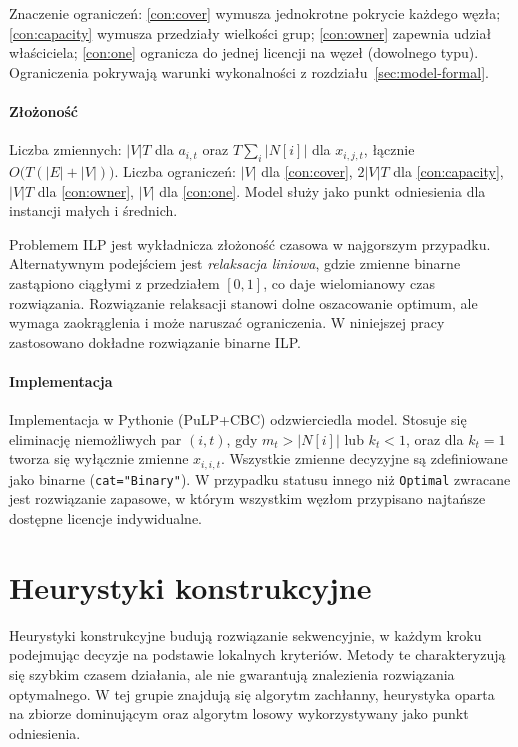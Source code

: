 Znaczenie ograniczeń: \eqref{con:cover} wymusza jednokrotne pokrycie każdego węzła; \eqref{con:capacity} wymusza przedziały wielkości grup; \eqref{con:owner} zapewnia udział właściciela; \eqref{con:one} ogranicza do jednej licencji na węzeł (dowolnego typu). Ograniczenia pokrywają warunki wykonalności z rozdziału~\ref{sec:model-formal}.

\paragraph{Złożoność}
Liczba zmiennych: \(|V|T\) dla \(a_{i,t}\) oraz \(T\sum_i |N[i]|\) dla \(x_{i,j,t}\), łącznie \(O\!\bigl(T(|E|+|V|)\bigr)\).
Liczba ograniczeń: \(|V|\) dla \eqref{con:cover}, \(2|V|T\) dla \eqref{con:capacity}, \(|V|T\) dla \eqref{con:owner}, \(|V|\) dla \eqref{con:one}.
Model służy jako punkt odniesienia dla instancji małych i średnich.

Problemem ILP jest wykładnicza złożoność czasowa w najgorszym przypadku. Alternatywnym podejściem jest \emph{relaksacja liniowa}, gdzie zmienne binarne zastąpiono ciągłymi z przedziałem \([0,1]\), co daje wielomianowy czas rozwiązania. Rozwiązanie relaksacji stanowi dolne oszacowanie optimum, ale wymaga zaokrąglenia i może naruszać ograniczenia. W niniejszej pracy zastosowano dokładne rozwiązanie binarne ILP.

\paragraph{Implementacja}
Implementacja w Pythonie (PuLP+CBC) odzwierciedla model. Stosuje się eliminację niemożliwych par \((i,t)\), gdy \(m_t>|N[i]|\) lub \(k_t<1\), oraz dla \(k_t=1\) tworza się wyłącznie zmienne \(x_{i,i,t}\).
Wszystkie zmienne decyzyjne są zdefiniowane jako binarne (\texttt{cat="Binary"}).
W przypadku statusu innego niż \texttt{Optimal} zwracane jest rozwiązanie zapasowe, w którym wszystkim węzłom przypisano najtańsze dostępne licencje indywidualne.

\section{Heurystyki konstrukcyjne}

Heurystyki konstrukcyjne budują rozwiązanie sekwencyjnie, w każdym kroku podejmując decyzje na podstawie lokalnych kryteriów. Metody te charakteryzują się szybkim czasem działania, ale nie gwarantują znalezienia rozwiązania optymalnego. W tej grupie znajdują się algorytm zachłanny, heurystyka oparta na zbiorze dominującym oraz algorytm losowy wykorzystywany jako punkt odniesienia.

